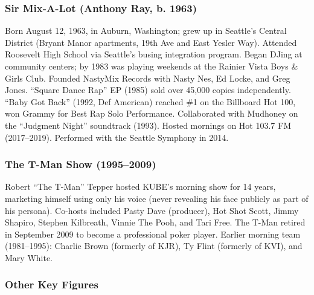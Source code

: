 \documentclass[11pt,letterpaper]{article}
\begin{document}
\subsubsection{Sir Mix-A-Lot (Anthony Ray, b. 1963)}
Born August 12, 1963, in Auburn, Washington; grew up in Seattle's Central District (Bryant Manor apartments, 19th Ave and East Yesler Way). Attended Roosevelt High School via Seattle's busing integration program. Began DJing at community centers; by 1983 was playing weekends at the Rainier Vista Boys \& Girls Club. Founded NastyMix Records with Nasty Nes, Ed Locke, and Greg Jones. ``Square Dance Rap'' EP (1985) sold over 45,000 copies independently. ``Baby Got Back'' (1992, Def American) reached \#1 on the Billboard Hot 100, won Grammy for Best Rap Solo Performance. Collaborated with Mudhoney on the ``Judgment Night'' soundtrack (1993). Hosted mornings on Hot 103.7 FM (2017--2019). Performed with the Seattle Symphony in 2014.

\subsubsection{The T-Man Show (1995--2009)}
Robert ``The T-Man'' Tepper hosted KUBE's morning show for 14 years, marketing himself using only his voice (never revealing his face publicly as part of his persona). Co-hosts included Pasty Dave (producer), Hot Shot Scott, Jimmy Shapiro, Stephen Kilbreath, Vinnie The Pooh, and Tari Free. The T-Man retired in September 2009 to become a professional poker player. Earlier morning team (1981--1995): Charlie Brown (formerly of KJR), Ty Flint (formerly of KVI), and Mary White.

\subsubsection{Other Key Figures}
\end{document}
